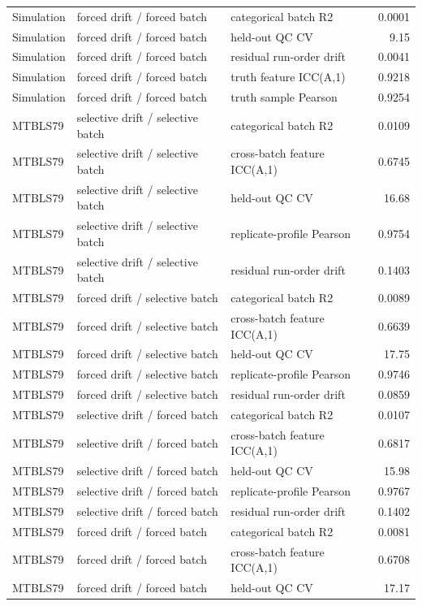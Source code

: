 \begin{longtable}{lllr}
Simulation & forced drift / forced batch & categorical batch R2 & 0.0001 \\
Simulation & forced drift / forced batch & held-out QC CV & 9.15 \\
Simulation & forced drift / forced batch & residual run-order drift & 0.0041 \\
Simulation & forced drift / forced batch & truth feature ICC(A,1) & 0.9218 \\
Simulation & forced drift / forced batch & truth sample Pearson & 0.9254 \\
MTBLS79 & selective drift / selective batch & categorical batch R2 & 0.0109 \\
MTBLS79 & selective drift / selective batch & cross-batch feature ICC(A,1) & 0.6745 \\
MTBLS79 & selective drift / selective batch & held-out QC CV & 16.68 \\
MTBLS79 & selective drift / selective batch & replicate-profile Pearson & 0.9754 \\
MTBLS79 & selective drift / selective batch & residual run-order drift & 0.1403 \\
MTBLS79 & forced drift / selective batch & categorical batch R2 & 0.0089 \\
MTBLS79 & forced drift / selective batch & cross-batch feature ICC(A,1) & 0.6639 \\
MTBLS79 & forced drift / selective batch & held-out QC CV & 17.75 \\
MTBLS79 & forced drift / selective batch & replicate-profile Pearson & 0.9746 \\
MTBLS79 & forced drift / selective batch & residual run-order drift & 0.0859 \\
MTBLS79 & selective drift / forced batch & categorical batch R2 & 0.0107 \\
MTBLS79 & selective drift / forced batch & cross-batch feature ICC(A,1) & 0.6817 \\
MTBLS79 & selective drift / forced batch & held-out QC CV & 15.98 \\
MTBLS79 & selective drift / forced batch & replicate-profile Pearson & 0.9767 \\
MTBLS79 & selective drift / forced batch & residual run-order drift & 0.1402 \\
MTBLS79 & forced drift / forced batch & categorical batch R2 & 0.0081 \\
MTBLS79 & forced drift / forced batch & cross-batch feature ICC(A,1) & 0.6708 \\
MTBLS79 & forced drift / forced batch & held-out QC CV & 17.17 \\

\end{longtable}

